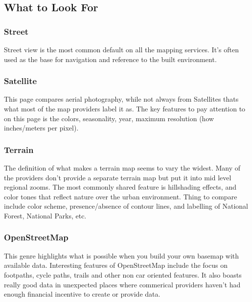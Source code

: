 \documentclass[12pt,letterpaper]{article}
\begin{document}
\subsection{What to Look For}
\subsubsection{Street}
Street view is the most common default on all the mapping services. It's often used as the base for navigation and reference to the built environment.

\subsubsection{Satellite}
This page compares aerial photography, while not always from Satellites thats what most of the map providers label it as. The key features to pay attention to on this page is the colors, seasonality, year, maximum resolution (how inches/meters per pixel).

\subsubsection{Terrain}
The definition of what makes a terrain map seems to vary the widest. Many of the providers don't provide a separate terrain map but put it into mid level regional zooms. The most commonly shared feature is hillshading effects, and color tones that reflect nature over the urban environment. Thing to compare include color scheme, presence/absence of contour lines, and labelling of National Forest, National Parks, etc.

\subsubsection{OpenStreetMap}
This genre highlights what is possible when you build your own basemap with available data. Interesting features of OpenStreetMap include the focus on footpaths, cycle paths, trails and other non car oriented features. It also boasts really good data in unexpected places where commerical providers haven't had enough financial incentive to create or provide data.
\end{document}
